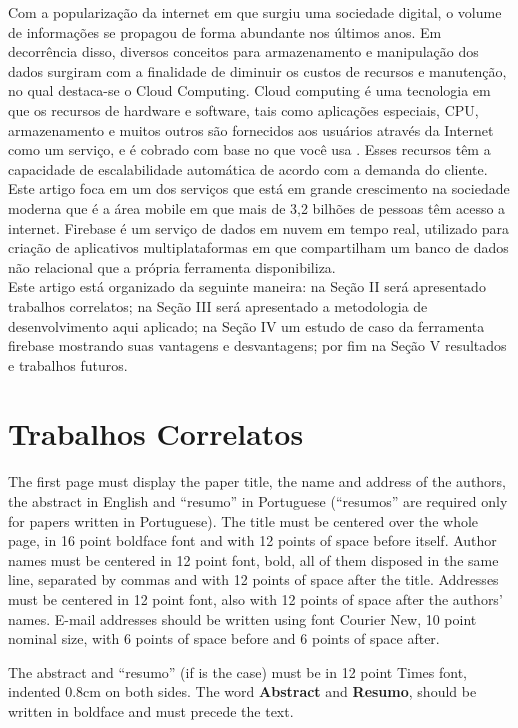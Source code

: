 \documentclass[12pt]{article}
\begin{document}
Com a popularização da internet em que surgiu uma sociedade digital, o volume de informações se propagou de forma abundante nos últimos anos. Em decorrência disso, diversos conceitos para armazenamento e manipulação dos dados surgiram com a finalidade de diminuir os custos de recursos e manutenção, no qual destaca-se o Cloud Computing. Cloud computing é uma tecnologia em que os recursos de hardware e software, tais como aplicações especiais, CPU, armazenamento e muitos outros são fornecidos aos usuários através da Internet como um serviço, e é cobrado com base no que você usa \cite{1}. Esses recursos têm a capacidade de escalabilidade automática de acordo com a demanda do cliente.
\\
Este artigo foca em um dos serviços que está em grande crescimento na sociedade moderna que é a área mobile em que mais de 3,2 bilhões de pessoas têm acesso a internet. Firebase é um serviço de dados em nuvem em tempo real, utilizado para criação de aplicativos multiplataformas em que compartilham um banco de dados não relacional que a própria ferramenta disponibiliza.
\\
Este artigo está organizado da seguinte maneira: na Seção II será apresentado trabalhos correlatos; na Seção III será apresentado a metodologia de desenvolvimento aqui aplicado; na Seção IV um estudo de caso da ferramenta firebase mostrando suas vantagens e desvantagens; por fim na Seção V resultados e trabalhos futuros.

\section{Trabalhos Correlatos} \label{sec:firstpage}

The first page must display the paper title, the name and address of the
authors, the abstract in English and ``resumo'' in Portuguese (``resumos'' are
required only for papers written in Portuguese). The title must be centered
over the whole page, in 16 point boldface font and with 12 points of space
before itself. Author names must be centered in 12 point font, bold, all of
them disposed in the same line, separated by commas and with 12 points of
space after the title. Addresses must be centered in 12 point font, also with
12 points of space after the authors' names. E-mail addresses should be
written using font Courier New, 10 point nominal size, with 6 points of space
before and 6 points of space after.

The abstract and ``resumo'' (if is the case) must be in 12 point Times font,
indented 0.8cm on both sides. The word \textbf{Abstract} and \textbf{Resumo},
should be written in boldface and must precede the text.
\end{document}
